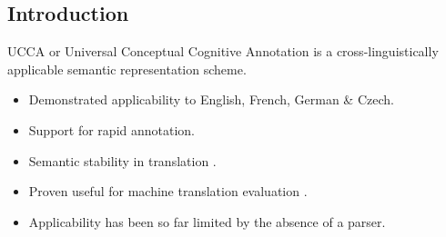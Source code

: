 \documentclass[a0,portrait]{a0poster}
\begin{document}
\begin{multicols}{2} %


\color{Black} %

\section*{Introduction}

\setlength{\columnsep}{1cm}

\begin{table}
  \vspace{-25mm}
  \begin{adjustbox}{margin=2mm,frame}
  \end{adjustbox}
\end{table}

UCCA or Universal Conceptual Cognitive Annotation \cite{abend2013universal}
is a cross-linguistically applicable semantic representation scheme.
\begin{itemize}
 \item Demonstrated applicability to English, French, German \& Czech.
 \item Support for rapid annotation.
 \item Semantic stability in translation \cite{sulem2015conceptual}.
 \item Proven useful for machine translation evaluation \cite{birch2016hume}.
 \item Applicability has been so far limited by the absence of a parser.
\end{itemize}


\end{multicols}
\end{document}
